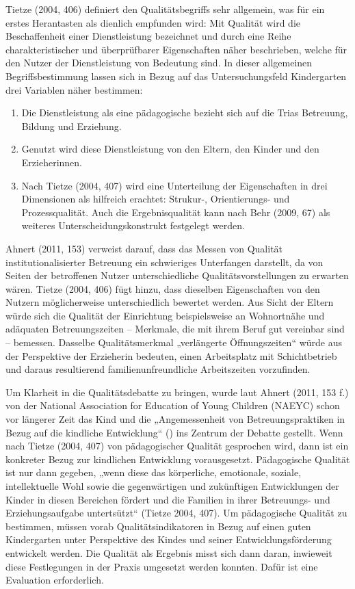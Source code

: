 Tietze (2004, 406) definiert den Qualitätsbegriffs sehr allgemein, was für ein erstes Herantasten als dienlich empfunden wird: Mit Qualität wird die Beschaffenheit einer Dienstleistung bezeichnet und durch eine Reihe charakteristischer und überprüfbarer Eigenschaften näher beschrieben, welche für den Nutzer der Dienstleistung von Bedeutung sind. In dieser allgemeinen Begriffsbestimmung lassen sich in Bezug auf das Untersuchungsfeld Kindergarten drei Variablen näher bestimmen: \begin{enumerate}
\item Die Dienstleistung als eine pädagogische bezieht sich auf die Trias Betreuung, Bildung und Erziehung.
\item Genutzt wird diese Dienstleistung von den Eltern, den Kinder und den Erzieherinnen.
\item Nach Tietze (2004, 407) wird eine Unterteilung der Eigenschaften in drei Dimensionen als hilfreich erachtet: Strukur-, Orientierungs- und Prozessqualität. Auch die Ergebnisqualität kann nach Behr (2009, 67) als weiteres Unterscheidungskonstrukt festgelegt werden.
\end{enumerate}

Ahnert (2011, 153) verweist darauf, dass das Messen von Qualität institutionalisierter Betreuung ein schwieriges Unterfangen darstellt, da von Seiten der betroffenen Nutzer unterschiedliche Qualitätsvorstellungen zu erwarten wären. Tietze (2004, 406) fügt hinzu, dass dieselben Eigenschaften von den Nutzern möglicherweise unterschiedlich bewertet werden. Aus Sicht der Eltern würde sich die Qualität der Einrichtung beispielsweise an Wohnortnähe und adäquaten Betreuungszeiten -- Merkmale, die mit ihrem Beruf gut vereinbar sind -- bemessen. Dasselbe Qualitätsmerkmal „verlängerte Öffnungszeiten“ würde aus der Perspektive der Erzieherin bedeuten, einen Arbeitsplatz mit Schichtbetrieb und daraus resultierend familienunfreundliche Arbeitszeiten vorzufinden.  

Um Klarheit in die Qualitätsdebatte zu bringen, wurde laut Ahnert (2011, 153 f.) von der National Association for Education of Young Children (NAEYC) schon vor längerer Zeit das Kind und die „Angemessenheit von Betreuungspraktiken in Bezug auf die kindliche Entwicklung“ () ins Zentrum der Debatte gestellt. Wenn nach Tietze (2004, 407) von pädagogischer Qualität gesprochen wird, dann ist ein konkreter Bezug zur kindlichen Entwicklung vorausgesetzt. Pädagogische Qualität ist nur dann gegeben, „wenn diese das körperliche, emotionale, soziale, intellektuelle Wohl sowie die gegenwärtigen und zukünftigen Entwicklungen der Kinder in diesen Bereichen fördert und die Familien in ihrer Betreuungs- und Erziehungsaufgabe untertsützt“ (Tietze 2004, 407). Um pädagogische Qualität zu bestimmen, müssen vorab Qualitätsindikatoren in Bezug auf einen guten Kindergarten unter Perspektive des Kindes und seiner Entwicklungsförderung entwickelt werden. Die Qualität als Ergebnis misst sich dann daran, inwieweit diese Festlegungen in der Praxis umgesetzt werden konnten. Dafür ist eine Evaluation erforderlich. 

